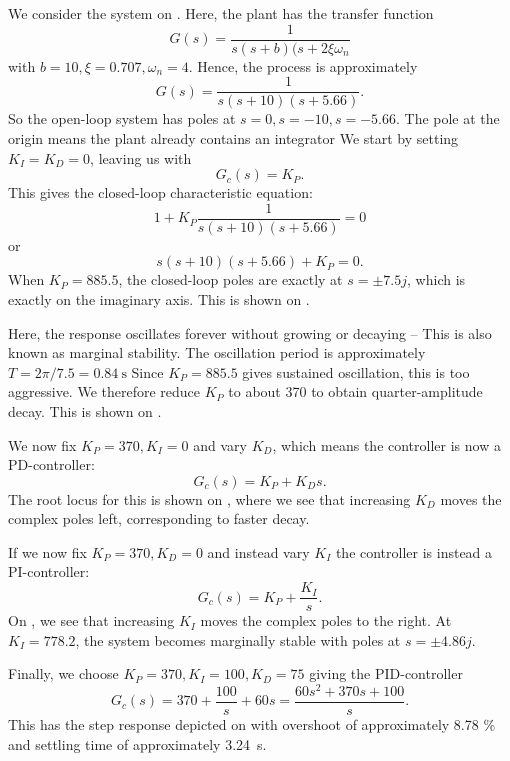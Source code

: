 \begin{exa}
  We consider the system on .
  Here, the plant has the transfer function
  \begin{equation*}
    G(s) = \frac{1}{s(s+b)(s+2\xi \omega_n}
  \end{equation*}
  with $b = 10, \xi = \num{0,707}, \omega_n = 4$.
  Hence, the process is approximately
  \begin{equation*}
    G(s) = \frac{1}{s(s+10)(s+\num{5,66} )}
  .\end{equation*}
  So the open-loop system has poles at $s = 0, s = -10, s = -\num{5,66}$.
  The pole at the origin means the plant already contains an integrator
  \tcblower
  We start by setting $K_I = K_D = 0$, leaving us with
  \begin{equation*}
    G_c(s) = K_P
  .\end{equation*}
  This gives the closed-loop characteristic equation:
  \begin{equation*}
    1 + K_P \frac{1}{s(s+10)(s+\num{5,66} )} = 0
  \end{equation*}
  or
  \begin{equation*}
    s (s+10)(s+\num{5,66} ) + K_P = 0
  .\end{equation*}
  When $K_P = \num{885,5}$, the closed-loop poles are exactly at $s = \pm \num{7,5} j$, which is exactly on the imaginary axis.
  This is shown on .

  Here, the response oscillates forever without growing or decaying -- This is also known as marginal stability.
  The oscillation period is approximately $T = 2\pi / \num{7,5}  = \qty{0,84}{\s}$
  Since $K_P = \num{885,5}$ gives sustained oscillation, this is too aggressive.
  We therefore reduce $K_P$ to about 370 to obtain quarter-amplitude decay.
  This is shown on .

  We now fix $K_P = 370, K_I = 0$ and vary $K_D$, which means the controller is now a PD-controller:
  \begin{equation*}
    G_c(s) = K_P + K_D s
  .\end{equation*}
  The root locus for this is shown on , where we see that increasing $K_D$ moves the complex poles left, corresponding to faster decay. 

  If we now fix $K_P = 370, K_D = 0$ and instead vary $K_I$ the controller is instead a PI-controller:
  \begin{equation*}
    G_c(s) = K_P + \frac{K_I}{s}
  .\end{equation*}
  On , we see that increasing $K_I$ moves the complex poles to the right. 
  At $K_I = \num{778,2}$, the system becomes marginally stable with poles at $s = \pm \num{4,86} j$.

  Finally, we choose $K_P = 370, K_I = 100, K_D = 75$ giving the PID-controller
  \begin{equation*}
    G_c(s) = 370 + \frac{100}{s} + 60s = \frac{60s^2 + 370 s + 100}{s}
  .\end{equation*}
  This has the step response depicted on  with overshoot of approximately \num{8,78} \% and settling time of approximately \qty{3,24}{\s}.
\end{exa}
